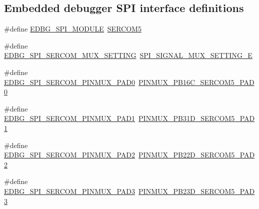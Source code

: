 \subsection*{Embedded debugger S\+PI interface definitions}
\begin{DoxyCompactItemize}
\item 
\#define \mbox{\hyperlink{group__samd21__xplained__pro__features__group_ga10c97c791efe2dd1b4bd8a577f5e0c44}{E\+D\+B\+G\+\_\+\+S\+P\+I\+\_\+\+M\+O\+D\+U\+LE}}~\mbox{\hyperlink{group___s_a_m_d21_j18_a__base_ga8785a316e608cb0a218f2a59655d6037}{S\+E\+R\+C\+O\+M5}}
\item 
\#define \mbox{\hyperlink{group__samd21__xplained__pro__features__group_ga038b971af0847e18d7abd8135d0fbab4}{E\+D\+B\+G\+\_\+\+S\+P\+I\+\_\+\+S\+E\+R\+C\+O\+M\+\_\+\+M\+U\+X\+\_\+\+S\+E\+T\+T\+I\+NG}}~\mbox{\hyperlink{group__asfdoc__sam0__sercom__spi__group_gga420e19efe4a923eb9ab6dc619a23c370a7234b3f4e0aa7fe723cc85edabea9816}{S\+P\+I\+\_\+\+S\+I\+G\+N\+A\+L\+\_\+\+M\+U\+X\+\_\+\+S\+E\+T\+T\+I\+N\+G\+\_\+E}}
\item 
\#define \mbox{\hyperlink{group__samd21__xplained__pro__features__group_gaef3069b7c754477829469c1628d7d1d4}{E\+D\+B\+G\+\_\+\+S\+P\+I\+\_\+\+S\+E\+R\+C\+O\+M\+\_\+\+P\+I\+N\+M\+U\+X\+\_\+\+P\+A\+D0}}~\mbox{\hyperlink{pio_2samd21j18a_8h_aeae967081710a10f32df07c0c02b3d7b}{P\+I\+N\+M\+U\+X\+\_\+\+P\+B16\+C\+\_\+\+S\+E\+R\+C\+O\+M5\+\_\+\+P\+A\+D0}}
\item 
\#define \mbox{\hyperlink{group__samd21__xplained__pro__features__group_gad5152d1a5c7472c8a49e91446df28219}{E\+D\+B\+G\+\_\+\+S\+P\+I\+\_\+\+S\+E\+R\+C\+O\+M\+\_\+\+P\+I\+N\+M\+U\+X\+\_\+\+P\+A\+D1}}~\mbox{\hyperlink{pio_2samd21j18a_8h_ad18d04a2d5389b2f3904cf45594bfa91}{P\+I\+N\+M\+U\+X\+\_\+\+P\+B31\+D\+\_\+\+S\+E\+R\+C\+O\+M5\+\_\+\+P\+A\+D1}}
\item 
\#define \mbox{\hyperlink{group__samd21__xplained__pro__features__group_ga47b3ed0d9a5ec64d1c1b2290bf0c338d}{E\+D\+B\+G\+\_\+\+S\+P\+I\+\_\+\+S\+E\+R\+C\+O\+M\+\_\+\+P\+I\+N\+M\+U\+X\+\_\+\+P\+A\+D2}}~\mbox{\hyperlink{pio_2samd21j18a_8h_a50be2bec24a1ecdce31937a77ab5d09f}{P\+I\+N\+M\+U\+X\+\_\+\+P\+B22\+D\+\_\+\+S\+E\+R\+C\+O\+M5\+\_\+\+P\+A\+D2}}
\item 
\#define \mbox{\hyperlink{group__samd21__xplained__pro__features__group_ga816d37a841e7021dd0e79343e1b933ff}{E\+D\+B\+G\+\_\+\+S\+P\+I\+\_\+\+S\+E\+R\+C\+O\+M\+\_\+\+P\+I\+N\+M\+U\+X\+\_\+\+P\+A\+D3}}~\mbox{\hyperlink{pio_2samd21j18a_8h_a55272a225c5d8830c891785a6e06c3f4}{P\+I\+N\+M\+U\+X\+\_\+\+P\+B23\+D\+\_\+\+S\+E\+R\+C\+O\+M5\+\_\+\+P\+A\+D3}}

\end{DoxyCompactItemize}
